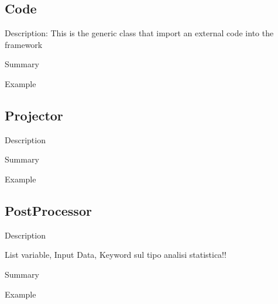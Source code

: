 \subsection{Code}
\label{sec:models_code}

Description: This is the generic class that import an external code into the framework

Summary

Example

\subsection{Projector}
\label{sec:models_projector}

Description

Summary

Example

\subsection{PostProcessor}
\label{sec:models_postProcessor}

Description

List variable, Input Data, 
Keyword sul tipo analisi statistica!!

Summary

Example